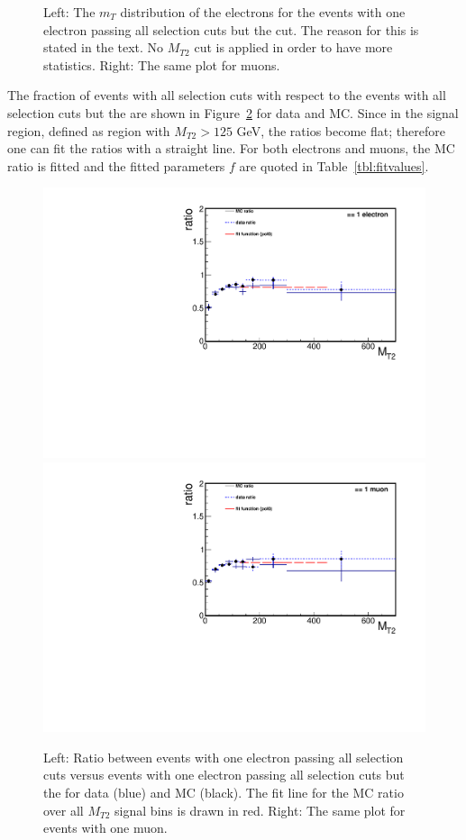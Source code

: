 \begin{figure}[htbp]
\caption{Left: The $m_T$ distribution of the electrons for the events with one electron 
passing all selection cuts but the \mindphifour cut. The reason for this is stated in the text. No $M_{T2}$ cut is applied in 
order to have more statistics. Right: The same plot for muons.}
\label{fig:mt}
\end{figure}

The fraction of events with all selection cuts with respect to the events with all 
selection cuts but the \mindphifour are shown 
in Figure~\ref{fig:fraction} for data and MC. Since in the signal region, defined as region with $M_{T2}>125$ GeV, the ratios become flat; therefore one can fit the ratios with a straight line. For both electrons and muons, the MC ratio is fitted and the fitted parameters $f$ are quoted in Table~\ref{tbl:fitvalues}.\\
\begin{figure}[htbp] 
\centering
\includegraphics[angle=0,scale=0.39]{llplots_20Invfb/ele_ratio.pdf} 
\includegraphics[angle=0,scale=0.39]{llplots_20Invfb/mu_ratio.pdf} \\
\caption{Left: Ratio between events with one electron passing all selection cuts 
versus events with one electron passing all selection cuts but the 
\mindphifour for data (blue) and MC (black). 
The fit line for the MC ratio over all $M_{T2}$ signal bins is drawn in red. Right: The same plot for events with one muon.}
\label{fig:fraction}
\end{figure}

